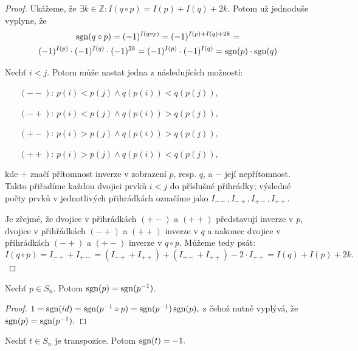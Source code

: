 \begin{proof}
    Ukážeme, že $\exists k \in \mathbb{Z}: I(q \circ p) = I(p) + I(q) + 2k$.
    Potom už jednoduše vyplyne, že 
    \begin{multline*} 
        \mathop{\mathrm{sgn}}(q \circ p) = (-1)^{I(q \circ p)} = (-1)^{I(p) + I(q) + 2k} = \\
        (-1)^{I(p)} \cdot (-1)^{I(q)} \cdot (-1)^{2k} = 
        (-1)^{I(p)} \cdot (-1)^{I(q)} = \mathop{\mathrm{sgn}}(p) \cdot \mathop{\mathrm{sgn}}(q)
    \end{multline*}
   
    Nechť $i < j$. Potom může nastat jedna z následujících možností:
    \begin{itemize}
            \centering
        \item[$(--)$:] $p(i) < p(j) \land q(p(i)) < q(p(j)),$
        \item[$(-+)$:] $p(i) < p(j) \land q(p(i)) > q(p(j)),$
        \item[$(+-)$:] $p(i) > p(j) \land q(p(i)) > q(p(j)),$
        \item[$(++)$:] $p(i) > p(j) \land q(p(i)) < q(p(j)),$
    \end{itemize}
    kde $+$ značí přítomnost inverze v zobrazení $p$, resp. $q$, a $-$ její
    nepřítomnost. Takto přiřadíme každou dvojici prvků $i<j$ do příslušné 
    přihrádky; výsledné počty prvků v jednotlivých přihrádkách označíme 
    jako $I_{--}, I_{-+}, I_{+-}, I_{++}$.

    Je zřejmé, že dvojice v přihrádkách $(+-)$ a $(++)$ představují 
    inverze 
    v $p$, dvojice v přihřádkách $(-+)$ a $(++)$ inverze v $q$ a nakonec 
    dvojice v přihrádkách $(-+)$ a $(+-)$ inverze v $q \circ p$. Můžeme 
    tedy psát: $$I(q \circ p) = I_{-+} + I_{+-} 
    = (I_{-+} + I_{++}) + (I_{+-} + I_{++}) - 2\cdot I_{++} 
    = I(q) + I(p) + 2k.$$
\end{proof}

\begin{corollary}
    \label{cor:sgnpsgnp-1}
    Nechť $p \in S_n$. Potom $\mathop{\mathrm{sgn}}(p) = \mathop{\mathrm{sgn}}(p^{-1})$.
\end{corollary}

\begin{proof}
    $1 = \mathop{\mathrm{sgn}}(id) = \mathop{\mathrm{sgn}}(p^{-1} \circ p) = \mathop{\mathrm{sgn}}(p^{-1}) \mathop{\mathrm{sgn}}(p),$ z čehož
    nutně vyplývá, že $\mathop{\mathrm{sgn}}(p) = \mathop{\mathrm{sgn}}(p^{-1}).$
\end{proof}

\begin{observation}
    Nechť $t \in S_n$ je transpozice. Potom $\mathop{\mathrm{sgn}}(t) = -1.$
\end{observation}


